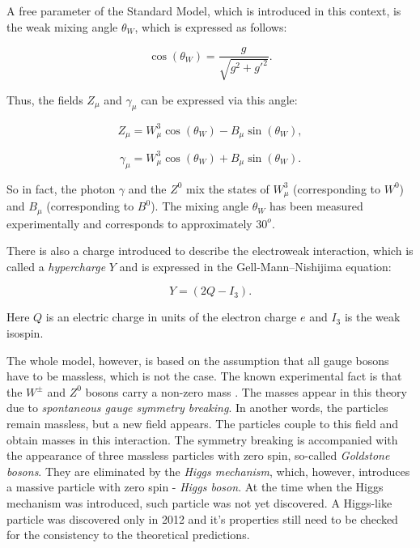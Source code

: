A free parameter of the Standard Model, which is introduced in this context, is the weak mixing angle $\theta_{W}$, which is expressed as follows:

\begin{equation}
 \cos(\theta_{W}) = \frac{g}{\sqrt{g^{2}+g'^{2}}}.
\end{equation}

Thus, the fields $Z_{\mu}$ and $\gamma_{\mu}$ can be expressed via this angle:

\begin{equation}
 Z_{\mu} = W^{3}_{\mu}\cos(\theta_{W}) - B_{\mu}\sin(\theta_{W}),
\end{equation}

\begin{equation}
 \gamma_{\mu} = W^{3}_{\mu}\cos(\theta_{W}) + B_{\mu}\sin(\theta_{W}).
\end{equation}

So in fact, the photon $\gamma$ and the $Z^{0}$ mix the states of $W^{3}_{\mu}$ (corresponding to $W^{0}$) and $B_{\mu}$ (corresponding to $B^{0}$).
The mixing angle $\theta_{W}$ has been measured experimentally \cite{PDG-2012} and corresponds to approximately $30^{o}$.

There is also a charge introduced to describe the electroweak interaction, which is called a \textit{hypercharge} $Y$ and is expressed in the Gell-Mann--Nishijima
equation:

\begin{equation}
 Y = (2Q - I_{3}).
\end{equation}

Here $Q$ is an electric charge in units of the electron charge $e$ and $I_{3}$ is the weak isospin.

The whole model, however, is based on the assumption that all gauge bosons have to be massless, which is not the case. The known experimental fact
is that the $W^{\pm}$ and $Z^{0}$ bosons carry a non-zero mass \cite{PDG-2012}. The masses appear in this theory due to \textit{spontaneous gauge symmetry
breaking}. In another words, the particles remain massless, but a new field appears. The particles couple to this field and obtain masses in this
interaction. The symmetry breaking is accompanied with the appearance of three massless particles with zero spin, so-called \textit{Goldstone bosons}.
They are eliminated by the \textit{Higgs mechanism}\cite{1964PhRvL..13..508H}, which, however, introduces a massive particle with zero spin - \textit{Higgs boson}. At the time when the
Higgs mechanism was introduced, such particle was not yet discovered. A Higgs-like particle was discovered only in 2012 \cite{Aad20121, Chatrchyan:2012xdj} 
and it's properties still need to be checked for the consistency to the theoretical predictions.


